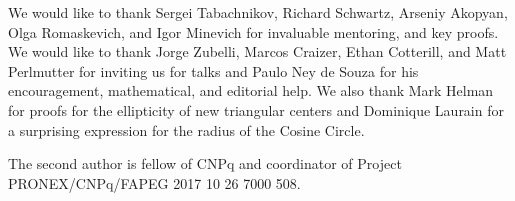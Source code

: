 \begin{acknowledgements}
We would like to thank Sergei Tabachnikov, Richard Schwartz, Arseniy Akopyan, Olga Romaskevich, and Igor Minevich for invaluable mentoring, and key proofs. We would like to thank Jorge Zubelli, Marcos Craizer, Ethan Cotterill, and Matt Perlmutter for inviting us for talks and Paulo Ney de Souza for his encouragement, mathematical, and editorial help. We also thank Mark Helman for proofs for the ellipticity of new triangular centers and Dominique Laurain for a surprising expression for the radius of the Cosine Circle.

The second author is fellow of CNPq and coordinator of Project PRONEX/CNPq/FAPEG 2017 10    26 7000 508.


\end{acknowledgements}